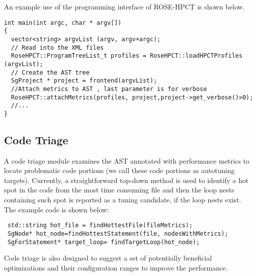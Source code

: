 An example use of the programming interface of ROSE-HPCT is shown below.
{\mySmallFontSize
\begin{verbatim}
int main(int argc, char * argv[]) 
{
  vector<string> argvList (argv, argv+argc);
  // Read into the XML files
  RoseHPCT::ProgramTreeList_t profiles = RoseHPCT::loadHPCTProfiles (argvList);
  // Create the AST tree
  SgProject * project = frontend(argvList);
  //Attach metrics to AST , last parameter is for verbose
  RoseHPCT::attachMetrics(profiles, project,project->get_verbose()>0);
  //...
}
\end{verbatim}
}

\subsection{Code Triage}
A code triage module examines the AST annotated with
performance metrics to locate problematic code portions (we call these code portions
as autotuning targets).
Currently, a straightforward top-down method is used to identify a hot spot
in the code from the most time consuming file and then the loop nests containing such spot is reported as a
tuning candidate, if the loop nests exist. The example code is shown below:
{\mySmallFontSize
\begin{verbatim}
 std::string hot_file = findHottestFile(fileMetrics);
 SgNode* hot_node=findHottestStatement(file, nodesWithMetrics);
 SgForStatement* target_loop= findTargetLoop(hot_node);

\end{verbatim}
}

Code triage is also designed to suggest a set of potentially beneficial optimizations and
their configuration ranges to improve the performance.


